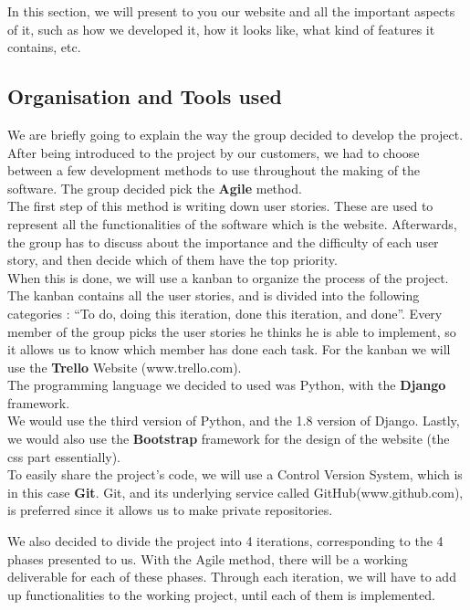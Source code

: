 \documentclass[a4paper, 12pt]{article}
\begin{document}
\newpage


In this section, we will present to you our website and all the important aspects of it, such as how we developed it, how it looks like, what kind of features it contains, etc.

\subsection{Organisation and Tools used}

We are briefly going to explain the way the group decided to develop the project. After being introduced to the project by our customers, we had to choose between a few development methods to use throughout the making of the software. The group decided pick the \textbf{Agile} method. \\

The first step of this method is writing down user stories. These are used to represent all the functionalities of the software which is the website. Afterwards, the group has to discuss about the importance and the difficulty of each user story, and then decide which of them have the top priority. \\

When this is done, we will use a kanban to organize the process of the project. The kanban contains all the user stories, and is divided into the following categories : “To do, doing this iteration, done this iteration, and done”. Every member of the group picks the user stories he thinks he is able to implement, so it allows us to know which member has done each task. For the kanban we will use the \textbf{Trello} Website (www.trello.com). \\

The programming language we decided to used was Python, with the \textbf{Django} framework.\\

We would use the third version of Python, and the 1.8 version of Django. Lastly, we would also use the \textbf{Bootstrap} framework for the design of the website (the css part essentially). \\

To easily share the project’s code, we will use a Control Version System, which is in this case \textbf{Git}. Git, and its underlying service called GitHub(www.github.com), is preferred since it allows us to make private repositories. 

We also decided to divide the project into 4 iterations, corresponding to the 4 phases presented to us. With the Agile method, there will be a working deliverable for each of these phases. Through each iteration, we will have to add up functionalities to the working project, until each of them is implemented.  \\
\end{document}
